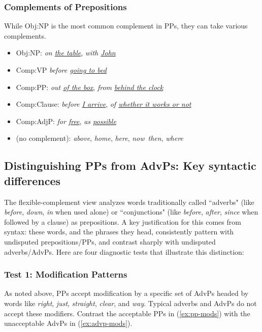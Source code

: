 \subsubsection*{Complements of Prepositions}\label{sec:PP-complementation}

While Obj:NP is the most common complement in PPs, they can take various complements.

\begin{itemize}
   \item Obj:NP: \textit{on \uline{the table}}, \textit{with \uline{John}}
   \item Comp:VP \textit{before \uline{going to bed}}
   \item Comp:PP: \textit{out \uline{of the box}}, \textit{from \uline{behind the clock}}
   \item Comp:Clause: \textit{before \uline{I arrive}}, \textit{of \uline{whether it works or not}}
   \item Comp:AdjP: \textit{for \uline{free}}, \textit{as \uline{possible}}
   \item (no complement): \textit{above}, \textit{home}, \textit{here}, \textit{now}\, \textit{then}, \textit{where}
\end{itemize}

\subsection{Distinguishing PPs from AdvPs: Key syntactic differences}\label{sec:distinguishing-pps-advps}

The flexible-complement view analyzes words traditionally called ``adverbs" (like \textit{before}, \textit{down}, \textit{in} when used alone) or ``conjunctions" (like \textit{before}, \textit{after}, \textit{since} when followed by a clause) as prepositions. A key justification for this comes from syntax: these words, and the phrases they head, consistently pattern with undisputed prepositions/PPs, and contrast sharply with undisputed adverbs/AdvPs. Here are four diagnostic tests that illustrate this distinction:

\subsubsection*{Test 1: Modification Patterns}\label{sec:test-modification}

As noted above, PPs accept modification by a specific set of AdvPs headed by words like \textit{right}, \textit{just}, \textit{straight}, \textit{clear}, and \textit{way}. Typical adverbs and AdvPs do not accept these modifiers. Contrast the acceptable PPs in (\ref{ex:pp-mods}) with the unacceptable AdvPs in (\ref{ex:advp-mods}).

